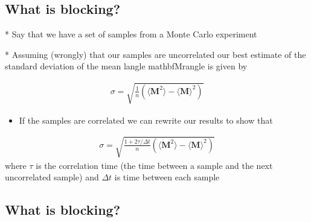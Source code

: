 \documentclass[letterpaper,10pt,english]{sphinxmanual}
\begin{document}
\subsection{What is blocking?}
\label{\detokenize{chapter2:what-is-blocking}}

\begin{sphinxVerbatim}[commandchars=\\\{\}]
* Say that we have a set of samples from a Monte Carlo experiment

* Assuming (wrongly) that our samples are uncorrelated our best estimate of the standard deviation of the mean \PYGZdl{}\PYGZbs{}langle \PYGZbs{}mathbf\PYGZob{}M\PYGZcb{}\PYGZbs{}rangle\PYGZdl{} is given by
\end{sphinxVerbatim}
\begin{equation*}
\begin{split}
\sigma=\sqrt{\frac{1}{n}\left(\langle \mathbf{M}^2\rangle-\langle \mathbf{M}\rangle^2\right)}
\end{split}
\end{equation*}\begin{itemize}
\item {} 
If the samples are correlated we can rewrite our results to show  that

\end{itemize}
\begin{equation*}
\begin{split}
\sigma=\sqrt{\frac{1+2\tau/\Delta t}{n}\left(\langle \mathbf{M}^2\rangle-\langle \mathbf{M}\rangle^2\right)}
\end{split}
\end{equation*}
where \(\tau\) is the correlation time (the time between a sample and the next uncorrelated sample) and \(\Delta t\) is time between each sample


\subsection{What is blocking?}
\label{\detokenize{chapter2:id17}}
\end{document}
